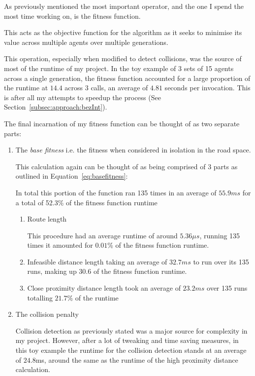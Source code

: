 As previously mentioned the most important operator, and the one I spend the most time working on, is the fitness function.

This acts as the objective function for the algorithm as it seeks to minimise its value across multiple agents over multiple generations.

This operation, especially when modified to detect collisions, was the source of most of the runtime of my project. In the toy example of 3 sets of 15 agents across a single generation, the fitness function accounted for a large proportion of the runtime at $14.4$ across 3 calls, an average of $4.81$ seconds per invocation. This is after all my attempts to speedup the process (See Section~\ref{subsec:approach:bezInt}).

The final incarnation of my fitness function can be thought of as two separate parts:

\begin{enumerate}
  \item The \textit{base fitness} i.e. the fitness when considered in isolation in the road space.

        This calculation again can be thought of as being comprised of 3 parts as outlined in Equation~\ref{eq:basefitness}:

        In total this portion of the function ran 135 times in an average of $55.9ms$ for a total of 52.3\% of the fitness function runtime

        \begin{enumerate}
          \item Route length

                This procedure had an average runtime of around $5.36\mu s$, running 135 times it amounted for $0.01$\% of the fitness function runtime.

          \item Infeasible distance length taking an average of $32.7ms$ to run over its 135 runs, making up $30.6$ of the fitness function runtime.
          \item Close proximity distance length took an average of $23.2ms$ over 135 runs totalling $21.7$\% of the runtime

        \end{enumerate}


  \item The collision penalty

        Collision detection as previously stated was a major source for complexity in my project. However, after a lot of tweaking and time saving measures, in this toy example the runtime for the collision detection stands at an average of $24.8$ms, around the same as the runtime of the high proximity distance calculation.
\end{enumerate}


